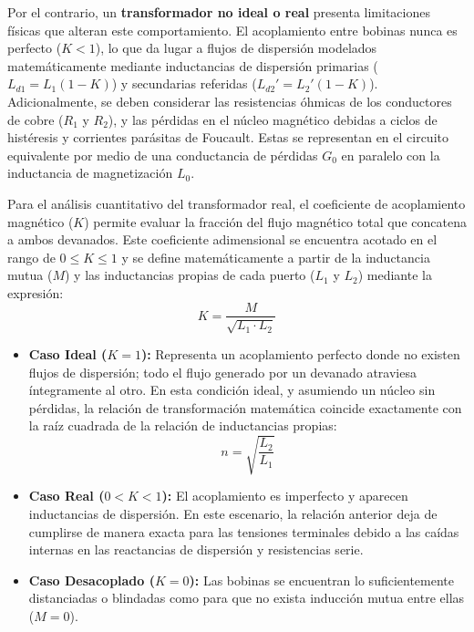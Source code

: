 Por el contrario, un \textbf{transformador no ideal o real} presenta limitaciones físicas que alteran este comportamiento. El acoplamiento entre bobinas nunca es perfecto ($K < 1$), lo que da lugar a flujos de dispersión modelados matemáticamente mediante inductancias de dispersión primarias ($L_{d1} = L_1(1-K)$) y secundarias referidas ($L_{d2}' = L_2'(1-K)$). Adicionalmente, se deben considerar las resistencias óhmicas de los conductores de cobre ($R_1$ y $R_2$), y las pérdidas en el núcleo magnético debidas a ciclos de histéresis y corrientes parásitas de Foucault. Estas se representan en el circuito equivalente por medio de una conductancia de pérdidas $G_0$ en paralelo con la inductancia de magnetización $L_0$.

Para el análisis cuantitativo del transformador real, el coeficiente de acoplamiento magnético ($K$) permite evaluar la fracción del flujo magnético total que concatena a ambos devanados. Este coeficiente adimensional se encuentra acotado en el rango de $0 \le K \le 1$ y se define matemáticamente a partir de la inductancia mutua ($M$) y las inductancias propias de cada puerto ($L_1$ y $L_2$) mediante la expresión:
\begin{equation}
    K = \frac{M}{\sqrt{L_1 \cdot L_2}}
\end{equation}

\begin{itemize}
    \item \textbf{Caso Ideal ($K = 1$):} Representa un acoplamiento perfecto donde no existen flujos de dispersión; todo el flujo generado por un devanado atraviesa íntegramente al otro. En esta condición ideal, y asumiendo un núcleo sin pérdidas, la relación de transformación matemática coincide exactamente con la raíz cuadrada de la relación de inductancias propias:
    \begin{equation}
        n = \sqrt{\frac{L_2}{L_1}}
    \end{equation}
    \item \textbf{Caso Real ($0 < K < 1$):} El acoplamiento es imperfecto y aparecen inductancias de dispersión. En este escenario, la relación anterior deja de cumplirse de manera exacta para las tensiones terminales debido a las caídas internas en las reactancias de dispersión y resistencias serie.
    \item \textbf{Caso Desacoplado ($K = 0$):} Las bobinas se encuentran lo suficientemente distanciadas o blindadas como para que no exista inducción mutua entre ellas ($M = 0$).
\end{itemize}

